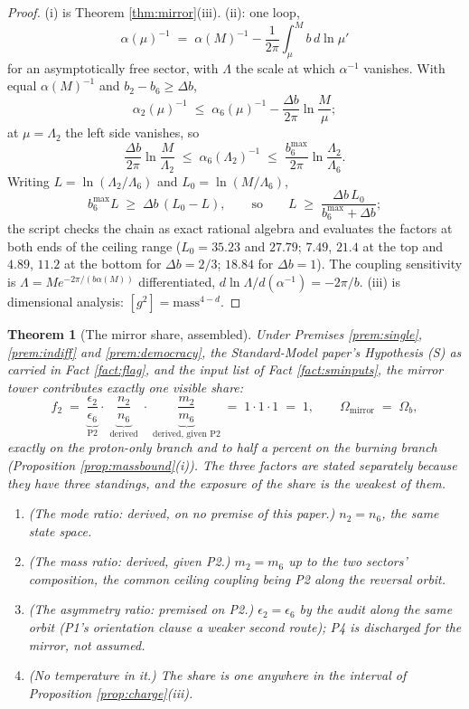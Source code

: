 \documentclass[11pt]{article}
\newtheorem{theorem}{Theorem}[section]
\theoremstyle{definition}
\begin{document}
\begin{proof}
(i) is Theorem \ref{thm:mirror}(iii). (ii): one loop,
\[
\alpha(\mu)^{-1} \;=\; \alpha(M)^{-1} - \frac{1}{2\pi}\int_{\mu}^{M} b\,d\ln\mu'
\]
for an asymptotically free sector, with $\Lambda$ the scale at which $\alpha^{-1}$ vanishes. With equal $\alpha(M)^{-1}$ and $b_{2} - b_{6} \geq \Delta b$,
\[
\alpha_{2}(\mu)^{-1} \;\leq\; \alpha_{6}(\mu)^{-1} - \frac{\Delta b}{2\pi}\ln\frac{M}{\mu};
\]
at $\mu = \Lambda_{2}$ the left side vanishes, so
\[
\frac{\Delta b}{2\pi}\ln\frac{M}{\Lambda_{2}} \;\leq\; \alpha_{6}(\Lambda_{2})^{-1} \;\leq\; \frac{b_{6}^{\max}}{2\pi}\ln\frac{\Lambda_{2}}{\Lambda_{6}}.
\]
Writing $L = \ln(\Lambda_{2}/\Lambda_{6})$ and $L_{0} = \ln(M/\Lambda_{6})$,
\[
b_{6}^{\max}L \;\geq\; \Delta b\,(L_{0} - L), \qquad\text{so}\qquad L \;\geq\; \frac{\Delta b\,L_{0}}{b_{6}^{\max} + \Delta b};
\]
the script checks the chain as exact rational algebra and evaluates the factors at both ends of the ceiling range ($L_{0} = 35.23$ and $27.79$; $7.49$, $21.4$ at the top and $4.89$, $11.2$ at the bottom for $\Delta b = 2/3$; $18.84$ for $\Delta b = 1$). The coupling sensitivity is $\Lambda = M e^{-2\pi/(b\alpha(M))}$ differentiated, $d\ln\Lambda/d(\alpha^{-1}) = -2\pi/b$. (iii) is dimensional analysis: $[g^{2}] = \text{mass}^{4-d}$.
\end{proof}


\begin{theorem}[The mirror share, assembled]\label{thm:share}
Under Premises \ref{prem:single}, \ref{prem:indiff} and \ref{prem:democracy}, the Standard-Model paper's Hypothesis (S) as carried in Fact \ref{fact:flag}, and the input list of Fact \ref{fact:sminputs}, the mirror tower contributes exactly one visible share:
\[
f_{2} \;=\; \underbrace{\frac{\epsilon_{2}}{\epsilon_{6}}}_{\text{P2}}\cdot\;\underbrace{\frac{n_{2}}{n_{6}}}_{\text{derived}}\;\cdot\;\underbrace{\frac{m_{2}}{m_{6}}}_{\text{derived, given P2}} \;=\; 1\cdot 1\cdot 1 \;=\; 1, \qquad \Omega_{\mathrm{mirror}} \;=\; \Omega_{b},
\]
exactly on the proton-only branch and to half a percent on the burning branch (Proposition \ref{prop:massbound}(i)). The three factors are stated separately because they have three standings, and the exposure of the share is the weakest of them.
\begin{enumerate}
\item[(i)] \emph{(The mode ratio: derived, on no premise of this paper.)} $n_{2} = n_{6}$, the same state space.
\item[(ii)] \emph{(The mass ratio: derived, given P2.)} $m_{2} = m_{6}$ up to the two sectors' composition, the common ceiling coupling being P2 along the reversal orbit.
\item[(iii)] \emph{(The asymmetry ratio: premised on P2.)} $\epsilon_{2} = \epsilon_{6}$ by the audit along the same orbit (P1's orientation clause a weaker second route); P4 is discharged for the mirror, not assumed.
\item[(iv)] \emph{(No temperature in it.)} The share is one anywhere in the interval of Proposition \ref{prop:charge}(iii).
\end{enumerate}
\end{theorem}
\end{document}
